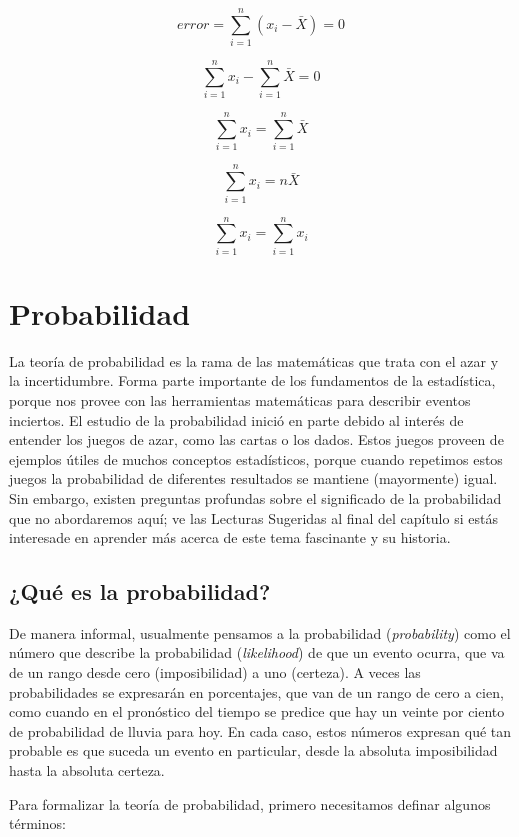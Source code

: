 \documentclass[
  12pt,
]{book}
\begin{document}
\[
error = \sum_{i=1}^{n}(x_i - \bar{X}) = 0
\]

\[
\sum_{i=1}^{n}x_i - \sum_{i=1}^{n}\bar{X}=0
\]

\[
\sum_{i=1}^{n}x_i = \sum_{i=1}^{n}\bar{X}
\]

\[
\sum_{i=1}^{n}x_i = n\bar{X}
\]

\[
\sum_{i=1}^{n}x_i = \sum_{i=1}^{n}x_i
\]

\hypertarget{probability}{%
\chapter{Probabilidad}\label{probability}}

La teoría de probabilidad es la rama de las matemáticas que trata con el azar y la incertidumbre. Forma parte importante de los fundamentos de la estadística, porque nos provee con las herramientas matemáticas para describir eventos inciertos. El estudio de la probabilidad inició en parte debido al interés de entender los juegos de azar, como las cartas o los dados. Estos juegos proveen de ejemplos útiles de muchos conceptos estadísticos, porque cuando repetimos estos juegos la probabilidad de diferentes resultados se mantiene (mayormente) igual. Sin embargo, existen preguntas profundas sobre el significado de la probabilidad que no abordaremos aquí; ve las Lecturas Sugeridas al final del capítulo si estás interesade en aprender más acerca de este tema fascinante y su historia.

\hypertarget{quuxe9-es-la-probabilidad}{%
\section{¿Qué es la probabilidad?}\label{quuxe9-es-la-probabilidad}}

De manera informal, usualmente pensamos a la probabilidad (\emph{probability}) como el número que describe la probabilidad (\emph{likelihood}) de que un evento ocurra, que va de un rango desde cero (imposibilidad) a uno (certeza). A veces las probabilidades se expresarán en porcentajes, que van de un rango de cero a cien, como cuando en el pronóstico del tiempo se predice que hay un veinte por ciento de probabilidad de lluvia para hoy. En cada caso, estos números expresan qué tan probable es que suceda un evento en particular, desde la absoluta imposibilidad hasta la absoluta certeza.

Para formalizar la teoría de probabilidad, primero necesitamos definar algunos términos:
\end{document}

